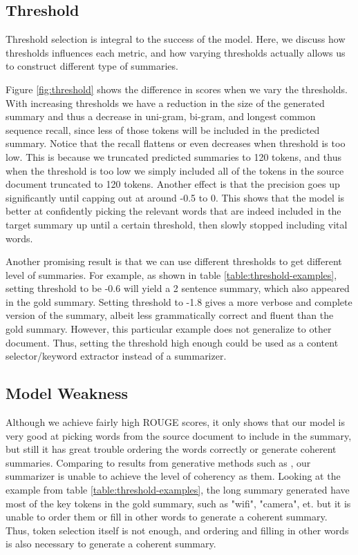\documentclass[11pt,a4paper]{article}
\begin{document}
\subsection{Threshold}
Threshold selection is integral to the success of the model. Here, we discuss how thresholds influences each metric, and how varying thresholds actually allows us to construct different type of summaries.

Figure \ref{fig:threshold} shows the difference in scores when we vary the thresholds. With increasing thresholds we have a reduction in the size of the generated summary and thus a decrease in uni-gram, bi-gram, and longest common sequence recall, since less of those tokens will be included in the predicted summary. Notice that the recall flattens or even decreases when threshold is too low. This is because we truncated predicted summaries to 120 tokens, and thus when the threshold is too low we simply included all of the tokens in the source document truncated to 120 tokens. Another effect is that the precision goes up significantly until capping out at around -0.5 to 0. This shows that the model is better at confidently picking the relevant words that are indeed included in the target summary up until a certain threshold, then slowly stopped including vital words.

Another promising result is that we can use different thresholds to get different level of summaries. For example, as shown in table \ref{table:threshold-examples}, setting threshold to be -0.6 will yield a 2 sentence summary, which also appeared in the gold summary. Setting threshold to -1.8 gives a more verbose and complete version of the summary, albeit less grammatically correct and fluent than the gold summary. However, this particular example does not generalize to other document. Thus, setting the threshold high enough could be used as a content selector/keyword extractor instead of a summarizer.

\subsection{Model Weakness}
Although we achieve fairly high ROUGE scores, it only shows that our model is very good at picking words from the source document to include in the summary, but still it has great trouble ordering the words correctly or generate coherent summaries. Comparing to results from generative methods such as \citet{pointer-generator}, our summarizer is unable to achieve the level of coherency as them. Looking at the example from table \ref{table:threshold-examples}, the long summary generated have most of the key tokens in the gold summary, such as "wifi", "camera", et. but it is unable to order them or fill in other words to generate a coherent summary. Thus, token selection itself is not enough, and ordering and filling in other words is also necessary to generate a coherent summary.
\end{document}
